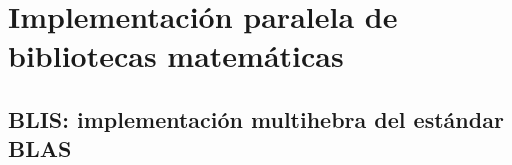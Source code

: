 %


\section{Implementación paralela de bibliotecas matemáticas}
\label{sec:bibliotecas}

\subsection{BLIS: implementación multihebra del estándar BLAS}

